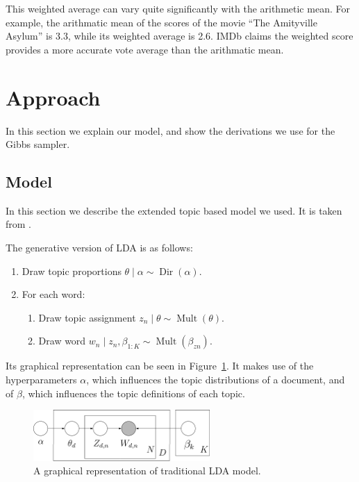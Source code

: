 \documentclass{article} %
\DeclareMathOperator{\Dir}{Dir}
\DeclareMathOperator{\Mult}{Mult}
\begin{document}
This weighted average can vary quite significantly with the arithmetic mean. 
For example, the arithmatic mean of the scores of the movie ``The Amityville Asylum'' is 3.3, while its weighted average is 2.6.
IMDb claims the weighted score provides a more accurate vote average than the arithmatic mean.

\section{Approach}
\label{sec:approach}
In this section we explain our model, and show the derivations we use for the Gibbs sampler.

\subsection{Model}
In this section we describe the extended topic based model we used.
It is taken from \cite{SLDA}.

The generative version of LDA is as follows:
\begin{enumerate}
  \item Draw topic proportions $\theta \mid \alpha \sim \Dir(\alpha)$.
  \item For each word:
  \begin{enumerate}
    \item Draw topic assignment $z_n \mid \theta \sim \Mult(\theta)$.
    \item Draw word $w_n \mid z_n, \beta_{1:K} \sim \Mult(\beta_{zn})$.
  \end{enumerate}
\end{enumerate}
Its graphical representation can be seen in Figure~\ref{fig:LDA}.
It makes use of the hyperparameters $\alpha$, which influences the topic distributions of a document, and of $\beta$, which influences the topic definitions of each topic.

\begin{figure}[ht!]
  \centering
  \includegraphics[width=0.6\textwidth]{LDA.png}
  \caption{A graphical representation of traditional LDA model.}
  \label{fig:LDA}
\end{figure}
\end{document}
